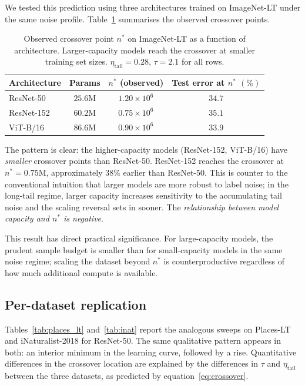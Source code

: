 \documentclass[11pt]{article}
\begin{document}
We tested this prediction using three architectures trained on ImageNet-LT under the same noise profile. Table~\ref{tab:capacity} summarises the observed crossover points.

\begin{table}[h]
\centering
\caption{Observed crossover point $n^{*}$ on ImageNet-LT as a function of architecture. Larger-capacity models reach the crossover at smaller training set sizes. $\eta_{\mathrm{tail}} = 0.28$, $\tau = 2.1$ for all rows.}
\label{tab:capacity}
\begin{tabular}{lccc}
\toprule
Architecture & Params & $n^{*}$ (observed) & Test error at $n^{*}$ $(\%)$ \\
\midrule
ResNet-50 & $25.6\text{M}$ & $1.20 \times 10^{6}$ & $34.7$ \\
ResNet-152 & $60.2\text{M}$ & $0.75 \times 10^{6}$ & $35.1$ \\
ViT-B/16 & $86.6\text{M}$ & $0.90 \times 10^{6}$ & $33.9$ \\
\bottomrule
\end{tabular}
\end{table}

The pattern is clear: the higher-capacity models (ResNet-152, ViT-B/16) have \emph{smaller} crossover points than ResNet-50. ResNet-152 reaches the crossover at $n^{*} = 0.75\text{M}$, approximately $38\%$ earlier than ResNet-50. This is counter to the conventional intuition that larger models are more robust to label noise; in the long-tail regime, larger capacity increases sensitivity to the accumulating tail noise and the scaling reversal sets in sooner. The \emph{relationship between model capacity and $n^{*}$ is negative}.

This result has direct practical significance. For large-capacity models, the prudent sample budget is smaller than for small-capacity models in the same noise regime; scaling the dataset beyond $n^{*}$ is counterproductive regardless of how much additional compute is available.

\subsection{Per-dataset replication}

Tables~\ref{tab:places_lt} and~\ref{tab:inat} report the analogous sweeps on Places-LT and iNaturalist-2018 for ResNet-50. The same qualitative pattern appears in both: an interior minimum in the learning curve, followed by a rise. Quantitative differences in the crossover location are explained by the differences in $\tau$ and $\eta_{\mathrm{tail}}$ between the three datasets, as predicted by equation~\eqref{eq:crossover}.
\end{document}
